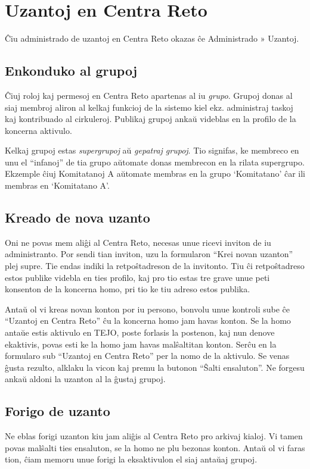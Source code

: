 \section{Uzantoj en Centra Reto}\label{sec:uzantoj}
Ĉiu administrado de uzantoj en Centra Reto okazas ĉe Administrado » Uzantoj.

\subsection{Enkonduko al grupoj}
Ĉiuj roloj kaj permesoj en Centra Reto apartenas al iu \textit{grupo}. Grupoj donas al siaj membroj aliron al kelkaj funkcioj de la sistemo kiel ekz. administraj taskoj kaj kontribuado al cirkuleroj. Publikaj grupoj ankaŭ videblas en la profilo de la koncerna aktivulo.

Kelkaj grupoj estas \textit{supergrupoj} aŭ \textit{gepatraj grupoj}. Tio signifas, ke membreco en unu el ``infanoj'' de tia grupo aŭtomate donas membrecon en la rilata supergrupo. Ekzemple ĉiuj Komitatanoj A aŭtomate membras en la grupo `Komitatano' ĉar ili membras en `Komitatano A'.

\subsection{Kreado de nova uzanto}
Oni ne povas mem aliĝi al Centra Reto, necesas unue ricevi inviton de iu administranto. Por sendi tian inviton, uzu la formularon ``Krei novan uzanton'' plej supre. Tie endas indiki la retpoŝtadreson de la invitonto. Tiu ĉi retpoŝtadreso estos publike videbla en ties profilo, kaj pro tio estas tre grave unue peti konsenton de la koncerna homo, pri tio ke tiu adreso estos publika.

Antaŭ ol vi kreas novan konton por iu persono, bonvolu unue kontroli sube ĉe ``Uzantoj en Centra Reto'' ĉu la koncerna homo jam havas konton. Se la homo antaŭe estis aktivulo en TEJO, poste forlasis la postenon, kaj nun denove ekaktivis, povas esti ke la homo jam havas malŝaltitan konton. Serĉu en la formularo sub ``Uzantoj en Centra Reto'' per la nomo de la aktivulo. Se venas ĝusta rezulto, alklaku la vicon kaj premu la butonon ``Ŝalti ensaluton''. Ne forgesu ankaŭ aldoni la uzanton al la ĝustaj grupoj.

\subsection{Forigo de uzanto}
Ne eblas forigi uzanton kiu jam aliĝis al Centra Reto pro arkivaj kialoj. Vi tamen povas malŝalti ties ensaluton, se la homo ne plu bezonas konton. Antaŭ ol vi faras tion, ĉiam memoru unue forigi la eksaktivulon el siaj antaŭaj grupoj.


